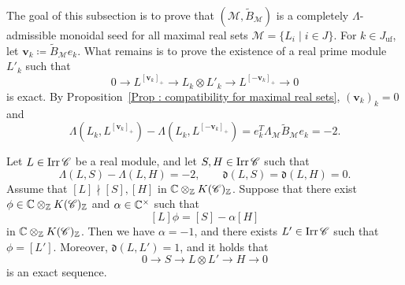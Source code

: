 The goal of this subsection is to prove that
$(\mathcal M, \widetilde B_{\mathcal M})$ is a completely
$\Lambda$-admissible monoidal seed for all maximal real sets
$\mathcal M = \{L_i \mid i \in J\}$.
For $k \in J_{\mathrm{uf}}$, let
$\mathbf v_k \coloneq \widetilde B_{\mathcal M}e_k$.
What remains is to prove the existence of a real prime module $L'_k$
such that
\[
0 \longrightarrow L^{[\mathbf v_k]_+}
\longrightarrow L_k \otimes L'_k
\longrightarrow L^{[-\mathbf v_k]_+}
\longrightarrow 0
\]
is exact.
By Proposition~\ref{Prop : compatibility for maximal real sets},
$(\mathbf v_k)_k = 0$ and
\[
\Lambda(L_k, L^{[\mathbf v_k]_+})
- \Lambda(L_k, L^{[-\mathbf v_k]_+})
= e_k^{T}\Lambda_{\mathcal M}\widetilde B_{\mathcal M}e_k
= -2.
\]

\begin{Lem}
\label{Lem : binomial divisibility by a real simple module}
Let $L \in \mathop{\mathrm{Irr}}\nolimits\mathscr{C}$ be a real module, and let
$S, H \in \mathop{\mathrm{Irr}}\nolimits\mathscr{C}$ such that
\[
\Lambda(L, S) - \Lambda(L, H) = -2,
\qquad
\mathfrak{d}(L, S) = \mathfrak{d}(L, H) = 0.
\]
Assume that $[L] \nmid [S], [H]$ in
$\mathbb{C} \otimes_{\mathbb{Z}} K(\mathscr{C})_{\mathbb{Z}}$.
Suppose that there exist
$\phi \in \mathbb{C} \otimes_{\mathbb{Z}} K(\mathscr{C})_{\mathbb{Z}}$
and $\alpha \in \mathbb{C}^{\times}$ such that
\[
[L]\phi = [S] - \alpha[H]
\]
in $\mathbb{C} \otimes_{\mathbb{Z}} K(\mathscr{C})_{\mathbb{Z}}$.
Then we have $\alpha = -1$, and there exists
$L' \in \mathop{\mathrm{Irr}}\nolimits\mathscr{C}$ such that $\phi = [L']$.
Moreover, $\mathfrak{d}(L, L') = 1$, and it holds that
\[
0 \longrightarrow S \longrightarrow L \otimes L'
\longrightarrow H \longrightarrow 0
\]
is an exact sequence.
\end{Lem}

